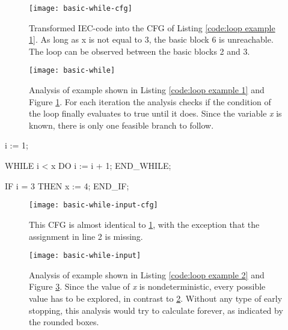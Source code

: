\begin{figure}[h!]
	\centering
	\texttt{[image: basic-while-cfg]}
	\caption{Transformed IEC-code into the CFG of Listing \ref{code:loop example 1}. As long as x is not equal to 3, the basic block 6 is unreachable. The loop can be observed between the basic blocks 2 and 3.}
	\label{fig:loop example 1 cfg}
\end{figure}
\begin{figure}[h!]
	\centering
	\texttt{[image: basic-while]}
	\caption{Analysis of example shown in Listing \ref{code:loop example 1} and Figure \ref{fig:loop example 1 cfg}. For each iteration the analysis checks if the condition of the loop finally evaluates to true until it does. Since the variable \emph{x} is known, there is only one feasible branch to follow.}
	\label{fig:loop example 1}
\end{figure}

\begin{program}[h!]
	\begin{GenericCode}
i := 1;
	
WHILE i < x DO
	i := i + 1;
END_WHILE;
	
IF i = 3 THEN
	x := 4;
END_IF;		\end{GenericCode}

\centering
\caption{Same as \ref{code:loop example 1}, but x is an input variable. Therefore it may be 3, so it could be reachable.}
\label{code:loop example 2}
\end{program}
\begin{figure}[h!]
	\centering
	\texttt{[image: basic-while-input-cfg]}
	\caption{This CFG is almost identical to \ref{fig:loop example 1 cfg}, with the exception that the assignment in line 2 is missing.}
	\label{fig:loop example 2 cfg}
\end{figure}
\begin{figure}[h!]
	\centering
	\texttt{[image: basic-while-input]}
	\caption{Analysis of example shown in Listing \ref{code:loop example 2} and Figure \ref{fig:loop example 2 cfg}. Since the value of \emph{x} is nondeterministic, every possible value has to be explored, in contrast to \ref{fig:loop example 1}. Without any type of early stopping, this analysis would try to calculate forever, as indicated by the rounded boxes. }
	\label{fig:loop example 2}
\end{figure}
